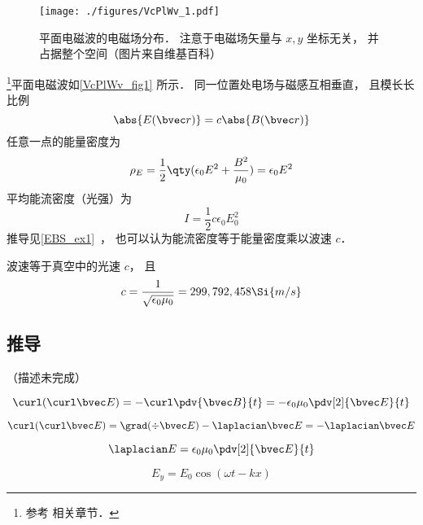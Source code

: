 
\begin{issues}
\issueDraft
\end{issues}


\begin{figure}[ht]
\centering
\texttt{[image: ./figures/VcPlWv\_1.pdf]}
\caption{平面电磁波的电磁场分布． 注意于电磁场矢量与 $x, y$ 坐标无关， 并占据整个空间（图片来自维基百科）} \label{VcPlWv_fig1}
\end{figure}

\footnote{参考 \cite{GriffE} 相关章节．}平面电磁波如\autoref{VcPlWv_fig1} 所示． 同一位置处电场与磁感互相垂直， 且模长长比例
\begin{equation}
\abs{E(\bvec r)} = c\abs{B(\bvec r)}
\end{equation}
任意一点的能量密度为
\begin{equation}
\rho_E = \frac{1}{2}\qty(\epsilon_0 E^2 + \frac{B^2}{\mu_0}) = \epsilon_0 E^2
\end{equation}
平均能流密度（光强）为
\begin{equation}
I = \frac12 c\epsilon_0 E_0^2
\end{equation}
推导见\autoref{EBS_ex1}~， 也可以认为能流密度等于能量密度乘以波速 $c$．

波速等于真空中的光速 $c$， 且
\begin{equation}\label{VcPlWv_eq1}
c = \frac{1}{\sqrt{\epsilon_0\mu_0}} = 299,792,458 \Si{m/s}
\end{equation}

\subsection{推导}
（描述未完成）

\begin{equation}
\curl(\curl \bvec E) = -\curl\pdv{\bvec B}{t} = -\epsilon_0\mu_0 \pdv[2]{\bvec E}{t}
\end{equation}

\begin{equation}
\curl(\curl \bvec E) = \grad(\div \bvec E) - \laplacian \bvec E = - \laplacian \bvec E
\end{equation}

\begin{equation}
\laplacian E = \epsilon_0 \mu_0 \pdv[2]{\bvec E}{t}
\end{equation}

\begin{equation}
E_y = E_0\cos(\omega t - kx)
\end{equation}
